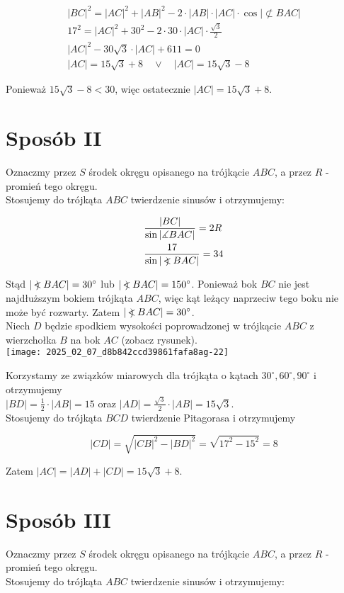 \documentclass[10pt]{article}
\newcommand\Varangle{\mathop{{<\!\!\!\!\!\text{\small)}}\:}\nolimits}
\begin{document}
$$
\begin{gathered}
|B C|^{2}=|A C|^{2}+|A B|^{2}-2 \cdot|A B| \cdot|A C| \cdot \cos |\not \subset B A C| \\
17^{2}=|A C|^{2}+30^{2}-2 \cdot 30 \cdot|A C| \cdot \frac{\sqrt{3}}{2} \\
|A C|^{2}-30 \sqrt{3} \cdot|A C|+611=0 \\
|A C|=15 \sqrt{3}+8 \quad \vee \quad|A C|=15 \sqrt{3}-8
\end{gathered}
$$

Ponieważ $15 \sqrt{3}-8<30$, więc ostatecznie $|A C|=15 \sqrt{3}+8$.

\section*{Sposób II}
Oznaczmy przez $S$ środek okręgu opisanego na trójkącie $A B C$, a przez $R$ - promień tego okręgu.\\
Stosujemy do trójkąta $A B C$ twierdzenie sinusów i otrzymujemy:

$$
\begin{aligned}
& \frac{|B C|}{\sin |\measuredangle B A C|}=2 R \\
& \frac{17}{\sin |\Varangle B A C|}=34
\end{aligned}
$$

Stąd $|\Varangle B A C|=30^{\circ}$ lub $|\Varangle B A C|=150^{\circ}$. Ponieważ bok $B C$ nie jest najdłuższym bokiem trójkąta $A B C$, więc kąt leżący naprzeciw tego boku nie może być rozwarty. Zatem $|\Varangle B A C|=30^{\circ}$.\\
Niech $D$ będzie spodkiem wysokości poprowadzonej w trójkącie $A B C$ z wierzchołka $B$ na bok $A C$ (zobacz rysunek).\\
\texttt{[image: 2025\_02\_07\_d8b842ccd39861fafa8ag-22]}

Korzystamy ze związków miarowych dla trójkąta o kątach $30^{\circ}, 60^{\circ}, 90^{\circ}$ i otrzymujemy\\
$|B D|=\frac{1}{2} \cdot|A B|=15$ oraz $|A D|=\frac{\sqrt{3}}{2} \cdot|A B|=15 \sqrt{3}$.\\
Stosujemy do trójkąta $B C D$ twierdzenie Pitagorasa i otrzymujemy

$$
|C D|=\sqrt{|C B|^{2}-|B D|^{2}}=\sqrt{17^{2}-15^{2}}=8
$$

Zatem $|A C|=|A D|+|C D|=15 \sqrt{3}+8$.

\section*{Sposób III}
Oznaczmy przez $S$ środek okręgu opisanego na trójkącie $A B C$, a przez $R$ - promień tego okręgu.\\
Stosujemy do trójkąta $A B C$ twierdzenie sinusów i otrzymujemy:
\end{document}
